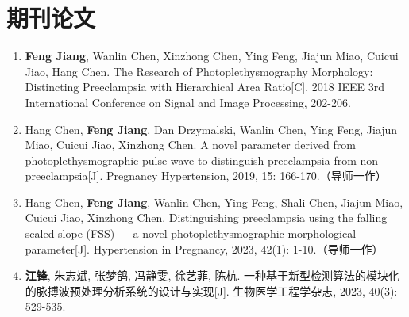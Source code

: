 {%
    \section*{期刊论文}
    \begin{enumerate}
        \item \textbf{Feng Jiang}, Wanlin Chen, Xinzhong Chen, Ying Feng, Jiajun Miao, Cuicui Jiao, Hang Chen. The Research of 
        Photoplethysmography Morphology: Distincting Preeclampsia with Hierarchical Area Ratio[C]. 
        2018 IEEE 3rd International Conference on Signal and Image Processing, 202-206.
        \item Hang Chen, \textbf{Feng Jiang}, Dan Drzymalski, Wanlin Chen, Ying Feng, Jiajun Miao, Cuicui Jiao, Xinzhong Chen. 
        A novel parameter derived from photoplethysmographic pulse wave to distinguish preeclampsia from non-preeclampsia[J]. 
        Pregnancy Hypertension, 2019, 15: 166-170.（导师一作）
        \item Hang Chen, \textbf{Feng Jiang}, Wanlin Chen, Ying Feng, Shali Chen, Jiajun Miao, Cuicui Jiao, Xinzhong Chen. 
        Distinguishing preeclampsia using the falling scaled slope (FSS) --- a novel photoplethysmographic morphological parameter[J]. 
        Hypertension in Pregnancy, 2023, 42(1): 1-10.（导师一作）
        \item \textbf{江锋}, 朱志斌, 张梦鸽, 冯静雯, 徐艺菲, 陈杭. 一种基于新型检测算法的模块化的脉搏波预处理分析系统的设计与实现[J]. 
        生物医学工程学杂志, 2023, 40(3): 529-535.
    \end{enumerate}
}